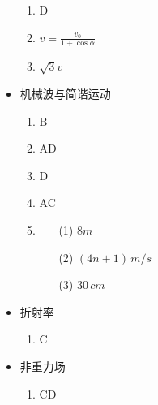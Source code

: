 \documentclass{article}
\begin{document}
\begin{minipage}{0.5\textwidth}
\begin{itemize}
              \begin{enumerate}
                  \item D
                  \item $v = \frac{v_{0}}{1+\cos{\alpha}}$
                  \item $\sqrt{3}v$
              \end{enumerate}
        \item 机械波与简谐运动
              \begin{enumerate}
                  \item B
                  \item AD
                  \item D
                  \item AC
                  \item \begin{itemize}
                    \item[(1)] $8m$ 
                    \item[(2)] $(4n+1) \, m/s$
                    \item[(3)] $30 \, cm$
                  \end{itemize}
              \end{enumerate}
        \item 折射率
              \begin{enumerate}
                  \item C
              \end{enumerate}
        \item 非重力场
              \begin{enumerate}
                  \item CD
              \end{enumerate}
    \end{itemize}
\end{minipage}
\end{document}

